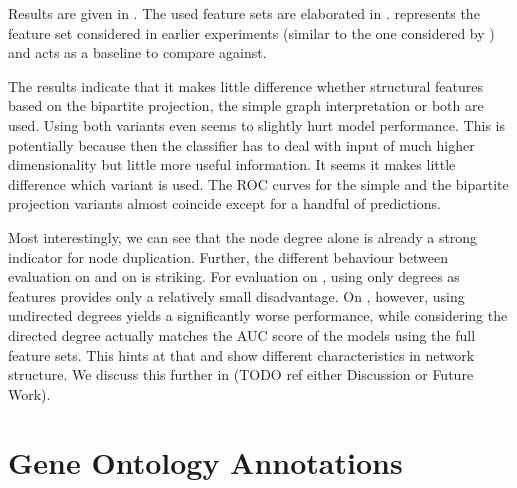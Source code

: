 \documentclass[
	fontsize=10pt, %
	twoside=false, %
	secnumdepth=1, %
  toc=indentunnumbered %
]{kaobook}
\begin{document}
Results are given in . The used feature sets are
elaborated in .  represents the
feature set considered in earlier experiments (similar to the one considered by
\nielsen) and acts as a baseline to compare against.

The results indicate that it makes little difference whether structural features
based on the bipartite projection, the simple graph interpretation or both are
used. Using both variants even seems to slightly hurt model performance. This is
potentially because then the classifier has to deal with input of much higher
dimensionality but little more useful information.
%
It seems it makes little difference which variant is used. The ROC curves for the simple
and the bipartite projection variants almost coincide except for a handful of
predictions.

Most interestingly, we can see that the node degree alone is already a strong
indicator for node duplication. Further, the different behaviour between
evaluation on \PDMap and on \ReconMap is striking. 
For evaluation on \PDMap, using only degrees as
features provides only a relatively small disadvantage. On \ReconMap, however,
using undirected degrees yields a significantly worse performance, while
considering the directed degree actually matches the AUC score of the models
using the full feature sets. This hints at that \PDMap and \ReconMap show
different characteristics in network structure. We discuss this further in (TODO
ref either Discussion or Future Work).


\section{Gene Ontology Annotations}
\label{sec:gene-ontology-annotations}




\end{document}
